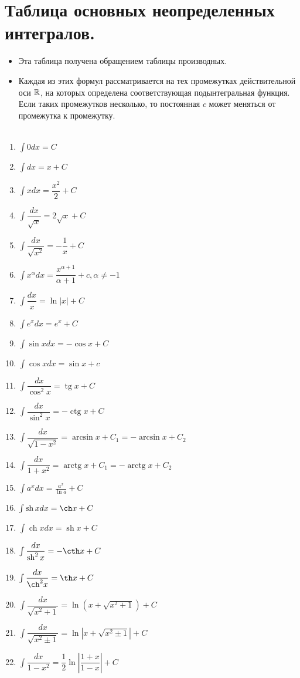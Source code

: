 \section{Таблица основных неопределенных интегралов.}
\begin{itemize}
	\item Эта таблица получена обращением таблицы производных.
	\item Каждая из этих формул рассматривается на тех промежутках действительной оси $\mathbb{R}$, на которых определена соответствующая подынтегральная функция. Если таких промежутков несколько, то постоянная $c$ может меняться от промежутка к промежутку.\\\\
\end{itemize}
\begin{enumerate}
	\item $\int 0d x=C$
	\item $\int d x=x+C$
	\item $\int xd x=\dfrac{x^2}{2}+C$
	\item $\int \dfrac{dx}{\sqrt{x}}=2 \sqrt{x}+C$
	\item  $\int \dfrac{dx}{\sqrt{x^2}}=-\dfrac{1}{x}+C$
	\item $\int x^\alpha d x=\dfrac{x^{\alpha+1}}{\alpha+1}+c, \alpha \neq-1$
	\item $\int \dfrac{d x}{x}=\ln |x|+C$
	\item $\int e^x d x=e^x+C$
	\item $\int \sin x d x=-\cos x+C$
	\item $\int \cos x d x=\sin x+c$
	\item $\int \dfrac{d x}{\cos ^2 x}=\operatorname{tg} x+C$
	\item $\int \dfrac{d x}{\sin ^2 x}=-\operatorname{ctg} x+C$
	\item$\int \dfrac{d x}{\sqrt{1-x^2}}=\arcsin x+C_1 = - \arcsin x+C_2$ 
	\item $\int \dfrac{d x}{1+x^2}=\operatorname{arctg} x +C_1 = -\operatorname{arctg} x +C_2$
	\item $\int a^x d x=\frac{a^x}{\ln a}+C$
	\item $\int \operatorname{sh} x d x=\ch x+C$
	\item $\int \operatorname{ch} x d x=\operatorname{sh} x+C$
	\item $\int \dfrac{d x}{\operatorname{sh}^2 x}=-\cth x+C$
	\item $\int \dfrac{d x}{\ch^2 x}=\th x+C$
	\item $\int \dfrac{d x}{\sqrt{x^2 + 1}}=\ln (x+\sqrt{x^2 + 1})+C$
	\item $\int \dfrac{d x}{\sqrt{x^2 \pm 1}}=\ln \left|x+\sqrt{x^2 \pm 1}\right|+C$
	\item $\int \dfrac{d x}{1-x^2}=\dfrac{1}{2} \ln \left|\dfrac{1+x}{1-x}\right|+C$
\end{enumerate}
